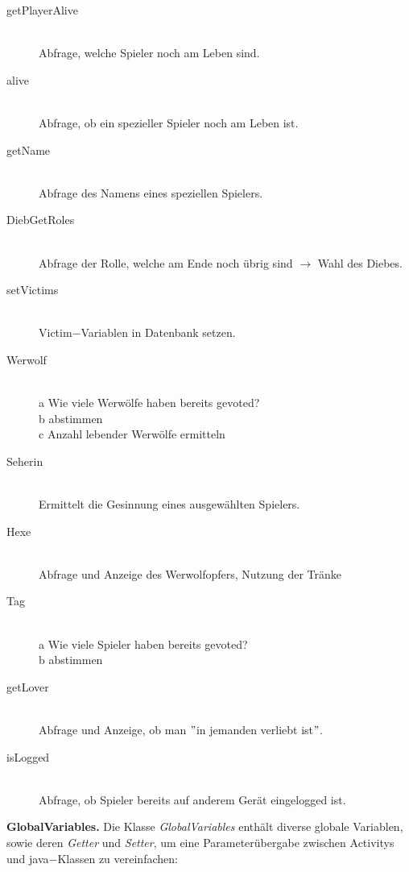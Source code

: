 \documentclass[12pt, a4paper]{article}
\begin{document}
\begin{description}
\item[getPlayerAlive]\hfill \\
Abfrage, welche Spieler noch am Leben sind.

\item[alive]\hfill \\
Abfrage, ob ein spezieller Spieler noch am Leben ist.

\item[getName]\hfill \\
Abfrage des Namens eines speziellen Spielers.

\item[DiebGetRoles]\hfill \\
Abfrage der Rolle, welche am Ende noch übrig sind $\rightarrow$ Wahl des Diebes.

\item[setVictims]\hfill \\
Victim$-$Variablen in Datenbank setzen.

\item[Werwolf]\hfill \\
a  Wie viele Werwölfe haben bereits gevoted?  \\
b  abstimmen \\
c  Anzahl lebender Werwölfe ermitteln

\item[Seherin]\hfill \\
Ermittelt die Gesinnung eines ausgewählten Spielers.

\item[Hexe]\hfill \\
Abfrage und Anzeige des Werwolfopfers, Nutzung der Tränke

\item[Tag]\hfill \\
a  Wie viele Spieler haben bereits gevoted? \\
b  abstimmen

\item[getLover]\hfill \\
Abfrage und Anzeige, ob man $"$in jemanden verliebt ist$"$.

\item[isLogged]\hfill \\
Abfrage, ob Spieler bereits auf anderem Gerät eingelogged ist.

\end{description}

\vspace{0,3 cm}

\textbf{GlobalVariables.}
Die Klasse \textit{GlobalVariables} enthält diverse globale Variablen, sowie deren \textit{Getter} und \textit{Setter}, um eine Parameterübergabe zwischen Activitys und java$-$Klassen zu vereinfachen:
\end{document}

